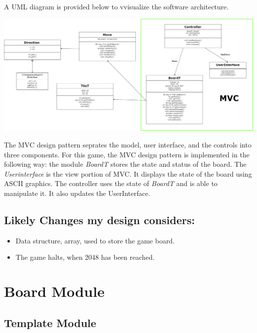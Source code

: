 \documentclass[12pt]{article}
\begin{document}
\noindent A UML diagram is provided below to vvisualize the software architecture.

\begin{center}
  \includegraphics[width=1\textwidth]{UML.png}
\end{center}

\medskip

The MVC design pattern seprates the model, user interface, and the controls into three components. For this game, the MVC design pattern is implemented in the following way: the module \textit{BoardT} stores the state and status of the board. The \textit{Userinterface} is the view portion of MVC. It displays the state of the board using ASCII graphics. The controller uses the state of \textit{BoardT} and is able to manipulate it. It also updates the UserInterface.

\newpage

\subsection*{Likely Changes my design considers:}

\begin{itemize}
  \item Data structure, array, used to store the game board.
  \item The game halts, when 2048 has been reached.
  
\end{itemize}

\newpage


\section* {Board Module}

\subsection*{Template Module}
\end{document}
